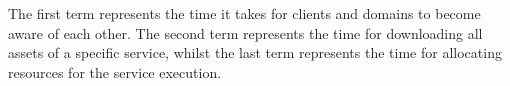 The first term represents the time it takes for clients and domains to become aware of each other. The second term represents the time for downloading all assets of a specific service, whilst the last term represents the time for allocating resources for the service execution. 




%
%
%

